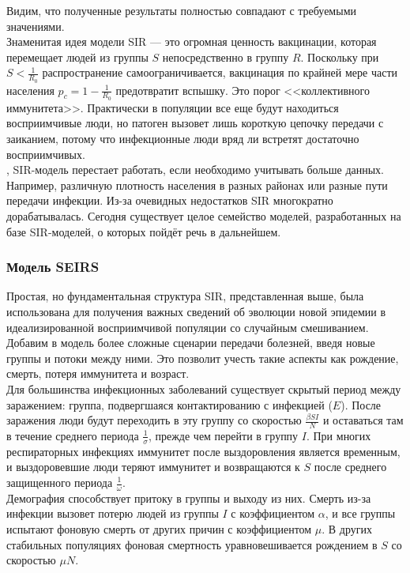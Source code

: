 \documentclass{article}
\begin{document}
\noindent Видим, что полученные результаты полностью совпадают с требуемыми значениями.\\

\noindent Знаменитая идея модели SIR — это огромная ценность вакцинации, которая перемещает людей из группы $S$ непосредственно в группу $R$. Поскольку при $S < \frac{1}{R_0}$ распространение самоограничивается, вакцинация по крайней мере части населения $p_c=1 - \frac{1}{R_0}$ предотвратит вспышку. Это порог <<коллективного иммунитета>>. Практически в популяции все еще будут находиться восприимчивые люди, но патоген вызовет лишь короткую цепочку передачи с заиканием, потому что инфекционные люди вряд ли встретят достаточно восприимчивых.\\

, SIR-модель перестает работать, если необходимо учитывать больше данных. Например, различную плотность населения в разных районах или разные пути передачи инфекции. Из-за очевидных недостатков SIR многократно дорабатывалась. Сегодня существует целое семейство моделей, разработанных на базе SIR-моделей, о которых пойдёт речь в дальнейшем.

\subsubsection{Модель SEIRS}

\noindent Простая, но фундаментальная структура SIR, представленная выше, была использована для получения важных сведений об эволюции новой эпидемии в идеализированной восприимчивой популяции со случайным смешиванием. Добавим в модель более сложные сценарии передачи болезней, введя новые группы и потоки между ними. Это позволит учесть такие аспекты как рождение, смерть, потеря иммунитета и возраст.\\

\noindent Для большинства инфекционных заболеваний существует скрытый период между заражением: группа, подвергшаяся контактированию с инфекцией ($E$). После заражения люди будут переходить в эту группу со скоростью $\frac{\beta S I}{N}$ и оставаться там в течение среднего периода $\frac{1}{\sigma}$, прежде чем перейти в группу $I$. При многих респираторных инфекциях иммунитет после выздоровления является временным, и выздоровевшие люди теряют иммунитет и возвращаются к $S$ после среднего защищенного периода $\frac{1}{\omega}$. \\

\noindent Демография способствует притоку в группы и выходу из них. Смерть из-за инфекции вызовет потерю людей из группы $I$ с коэффициентом $\alpha$, и все группы испытают фоновую смерть от других причин с коэффициентом $\mu$. В других стабильных популяциях фоновая смертность уравновешивается рождением в $S$ со скоростью $\mu N$.\\
\end{document}

